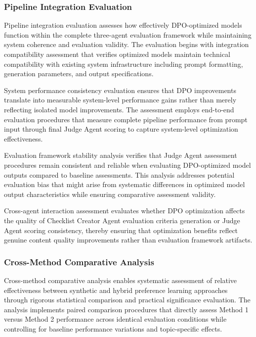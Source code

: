 \subsubsection{Pipeline Integration Evaluation}

Pipeline integration evaluation assesses how effectively DPO-optimized models function within the complete three-agent evaluation framework while maintaining system coherence and evaluation validity. The evaluation begins with integration compatibility assessment that verifies optimized models maintain technical compatibility with existing system infrastructure including prompt formatting, generation parameters, and output specifications.

System performance consistency evaluation ensures that DPO improvements translate into measurable system-level performance gains rather than merely reflecting isolated model improvements. The assessment employs end-to-end evaluation procedures that measure complete pipeline performance from prompt input through final Judge Agent scoring to capture system-level optimization effectiveness.

Evaluation framework stability analysis verifies that Judge Agent assessment procedures remain consistent and reliable when evaluating DPO-optimized model outputs compared to baseline assessments. This analysis addresses potential evaluation bias that might arise from systematic differences in optimized model output characteristics while ensuring comparative assessment validity.

Cross-agent interaction assessment evaluates whether DPO optimization affects the quality of Checklist Creator Agent evaluation criteria generation or Judge Agent scoring consistency, thereby ensuring that optimization benefits reflect genuine content quality improvements rather than evaluation framework artifacts.

\subsubsection{Cross-Method Comparative Analysis}

Cross-method comparative analysis enables systematic assessment of relative effectiveness between synthetic and hybrid preference learning approaches through rigorous statistical comparison and practical significance evaluation. The analysis implements paired comparison procedures that directly assess Method 1 versus Method 2 performance across identical evaluation conditions while controlling for baseline performance variations and topic-specific effects.

